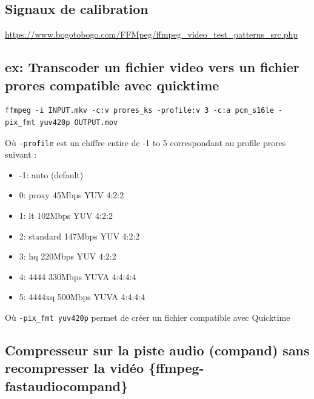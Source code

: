 \documentclass[
  french,
]{book}
\providecommand{\tightlist}{%
  \setlength{\itemsep}{0pt}\setlength{\parskip}{0pt}}
\begin{document}
\hypertarget{signaux-de-calibration}{%
\subsection{Signaux de calibration}\label{signaux-de-calibration}}

\url{https://www.bogotobogo.com/FFMpeg/ffmpeg_video_test_patterns_src.php}

\hypertarget{ex-transcoder-un-fichier-video-vers-un-fichier-prores-compatible-avec-quicktime}{%
\subsection{ex: Transcoder un fichier video vers un fichier prores compatible avec quicktime}\label{ex-transcoder-un-fichier-video-vers-un-fichier-prores-compatible-avec-quicktime}}

\begin{verbatim}
ffmpeg -i INPUT.mkv -c:v prores_ks -profile:v 3 -c:a pcm_s16le -pix_fmt yuv420p OUTPUT.mov
\end{verbatim}

Où \texttt{-profile} est un chiffre entire de -1 to 5 correspondant au profile prores suivant :

\begin{itemize}
\tightlist
\item
  -1: auto (default)
\item
  0: proxy 45Mbps YUV 4:2:2
\item
  1: lt 102Mbps YUV 4:2:2
\item
  2: standard 147Mbps YUV 4:2:2
\item
  3: hq 220Mbps YUV 4:2:2
\item
  4: 4444 330Mbps YUVA 4:4:4:4
\item
  5: 4444xq 500Mbps YUVA 4:4:4:4
\end{itemize}

Où \texttt{-pix\_fmt\ yuv420p} permet de créer un fichier compatible avec Quicktime

\hypertarget{compresseur-sur-la-piste-audio-compand-sans-recompresser-la-viduxe9o-ffmpeg-fastaudiocompand}{%
\subsection{Compresseur sur la piste audio (compand) sans recompresser la vidéo \{ffmpeg-fastaudiocompand\}}\label{compresseur-sur-la-piste-audio-compand-sans-recompresser-la-viduxe9o-ffmpeg-fastaudiocompand}}
\end{document}
